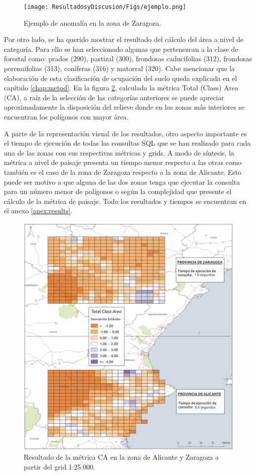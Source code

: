 \begin{figure}
\begin{center}
\texttt{[image: ResultadosyDiscusion/Figs/ejemplo.png]}
\caption{Ejemplo de anomalía en la zona de Zaragoza. \label{fig:ejemplo}}
\end{center}
\end{figure}

Por otro lado, se ha querido mostrar el resultado del cálculo del área a nivel de categoría. Para ello se han seleccionado algunas que pertenezcan a la clase de forestal como: prados (290), pastizal (300), frondosas caducifolias (312), frondosas perennifolias (313), coníferas (316) y matorral (320). Cabe mencionar que la elaboración de esta clasificación de ocupación del suelo queda explicada en el capítulo \ref{chap:metod}. En la figura \ref{fig:c_25}, calculada la métrica Total (Class) Area (CA), a raíz de la selección de las categorías anteriores se puede apreciar aproximadamente la disposición del relieve donde en las zonas más interiores se encuentran los polígonos con mayor área.

A parte de la representación visual de los resultados, otro aspecto importante es el tiempo de ejecución de todas las consultas SQL que se han realizado para cada una de las zonas con sus respectivas métricas y grids. A modo de síntesis, la métrica a nivel de paisaje presenta un tiempo menor respecto a las otras como también es el caso de la zona de Zaragoza respecto a la zona de Alicante. Esto puede ser motivo a que alguna de las dos zonas tenga que ejecutar la consulta para un número menor de polígonos o según la complejidad que presente el cálculo de la métrica de paisaje. Todo los resultados y tiempos se encuentran en el anexo \ref{anex:results}.



\begin{figure}
\begin{center}
\includegraphics[width=\textwidth]{ResultadosyDiscusion/Figs/Results/c_25.png}
\caption{Resultado de la métrica CA en la zona de Alicante y Zaragoza a partir del grid 1:25.000. \label{fig:c_25}}
\end{center}
\end{figure}
